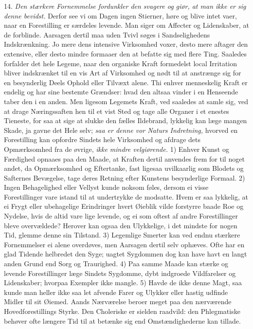 \documentclass[12pt,a4paper]{article}
\newcommand{\opage}[1]{\marginnote{\footnotesize\textit{[#1]}}}
\begin{document}
14. \emph{Den stærkere Fornemmelse fordunkler den svagere og giør, at man ikke er sig
denne bevidst.} Derfor see vi om Dagen ingen Stierner, høre og blive intet vaer, naar en
Forestilling er særdeles levende. Man siger om Affecter og Lidenskaber, at de forblinde.
Aarsagen dertil maa uden Tvivl søges i Sandselighedens Indskrænkning. Jo mere dens
intensive Virksomhed voxer, desto mere aftager den extensive, eller desto mindre
formaaer den at befatte sig med flere Ting. Saaledes forfalder det hele Legeme, naar den
organiske Kraft formedelst local Irritation bliver indskrænket til en vis Art af
Virksomhed og nødt til at anstrænge sig for en besynderlig Deels Ophold eller Tilvæxt
alene. Thi enhver menneskelig Kraft er endelig og har sine bestemte Grændser: hvad den
altsaa vinder i en Henseende taber den i en anden. Men ligesom Legemets Kraft, ved
saaledes at samle sig, ved at drage Næringssaften hen til et vist Sted og tage alle
Organer i et enestes Tieneste, for saa at sige at slukke den fælles Ildebrand, lykkelig
kan læge mangen Skade, ja gavne det Hele selv; \emph{saa er denne vor Naturs
Indretning,} hvorved en Forestilling kan opfordre Sindets hele Virksomhed og afdrage
dets Opmærksomhed fra de øvrige, \emph{ikke mindre velgiørende.} 1) Enhver Kunst og
Færdighed opnaaes paa den Maade, at
\opage{84} Kraften dertil anvendes frem for til noget andet, da Opmærksomhed og Eftertanke, fast
ligesaa uvilkaarlig som Blodets og Safternes Bevægelse, tage deres Retning efter
Kunstens besynderlige Formaal. 2) Ingen Behagelighed eller Vellyst kunde noksom føles,
dersom ei visse Forestillinger vare istand til at undertrykke de modsatte. Hvem er saa
lykkelig, at ei Frygt eller ubehagelige Erindringer hvert Øieblik vilde forstyrre baade
Roe og Nydelse, hvis de altid vare lige levende, og ei som oftest af andre
Forestillinger bleve overvældede? Herover kan ogsaa den Ulykkelige, i det mindste for
nogen Tid, glemme denne sin Tilstand. 3) Legemlige Smerter kan ved endnu stærkere
Fornemmelser ei alene overdøves, men Aarsagen dertil selv ophæves. Ofte har en glad
Tidende helbredet den Syge; uagtet Sygdommen dog kan have havt en langt anden Grund end
Sorg og Traurighed. 4) Paa samme Maade kan stærke og levende Forestillinger læge Sindets
Sygdomme, dybt indgroede Vildfarelser og Lidenskaber; hvorpaa Exempler ikke mangle.
5) Havde de ikke denne Magt, saa kunde man heller ikke saa let afvende Farer og Ulykker
eller hastig udfinde Midler til sit Øiemed. Aands Nærværelse beroer meget paa den
nærværende Hovedforestillings Styrke. Den Choleriske er sielden raadvild: den
Phlegmatiske behøver ofte længere Tid til at betænke sig end Omstændighederne kan
tillade.
\end{document}
